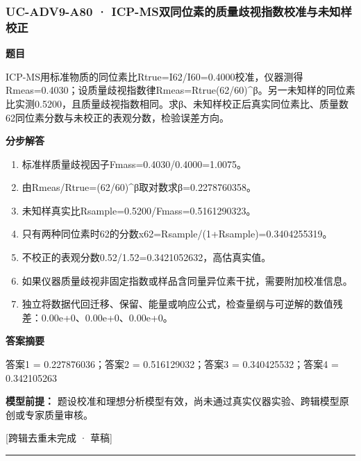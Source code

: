 \documentclass[UTF8,11pt,a4paper]{ctexart}
\begin{document}
\subsubsection*{UC-ADV9-A80 · ICP-MS双同位素的质量歧视指数校准与未知样校正}
\noindent\textbf{题目}\par
ICP-MS用标准物质的同位素比Rtrue=I62/I60=0.4000校准，仪器测得Rmeas=0.4030；设质量歧视指数律Rmeas=Rtrue(62/60)\textasciicircum{}β。另一未知样的同位素比实测0.5200，且质量歧视指数相同。求β、未知样校正后真实同位素比、质量数62同位素分数与未校正的表观分数，检验误差方向。\par
\medskip\noindent\textbf{分步解答}
\begin{enumerate}
\item 标准样质量歧视因子Fmass=0.4030/0.4000=1.0075。
\item 由Rmeas/Rtrue=(62/60)\textasciicircum{}β取对数求β=0.2278760358。
\item 未知样真实比Rsample=0.5200/Fmass=0.5161290323。
\item 只有两种同位素时62的分数x62=Rsample/(1+Rsample)=0.3404255319。
\item 不校正的表观分数0.52/1.52=0.3421052632，高估真实值。
\item 如果仪器质量歧视非固定指数或样品含同量异位素干扰，需要附加校准信息。
\item 独立将数据代回迁移、保留、能量或响应公式，检查量纲与可逆解的数值残差：0.00e+0、0.00e+0、0.00e+0。
\end{enumerate}
\noindent\textbf{答案摘要}\par
答案1 = 0.227876036；答案2 = 0.516129032；答案3 = 0.340425532；答案4 = 0.342105263\par
\noindent\textbf{模型前提：}
题设校准和理想分析模型有效，尚未通过真实仪器实验、跨辑模型原创或专家质量审核。\par
\noindent\textcolor{red!65!black}{[跨辑去重未完成 · 草稿]} \par
\medskip\hrule\medskip
{}
\end{document}
